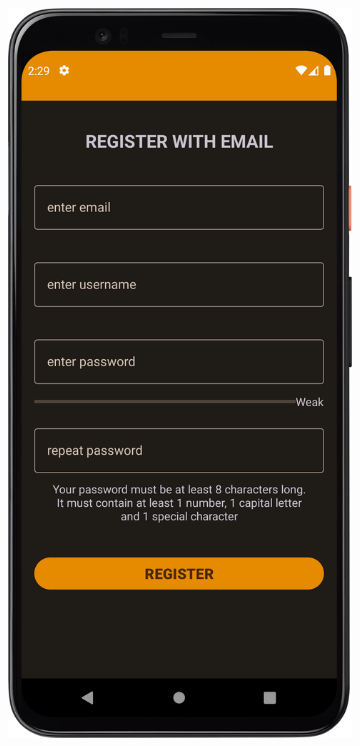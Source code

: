         \vspace{1cm}
        \begin{figure}[!ht]%
            \centering
            \begin{subfigure}[b]{0.3\textwidth}
                \centering
                \includegraphics[width=\textwidth]{src/app/register1.png}

\end{subfigure}
\end{figure}
